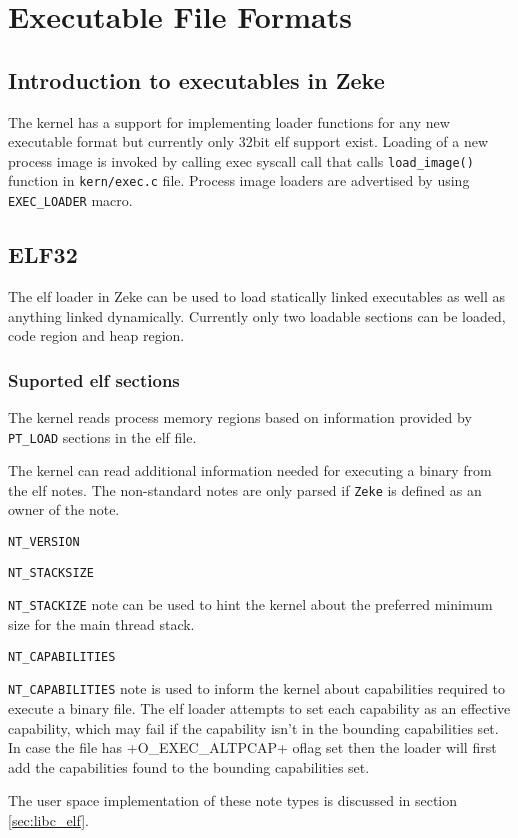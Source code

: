 \chapter{Executable File Formats}
\label{chap:exec}

\section{Introduction to executables in Zeke}

The kernel has a support for implementing loader functions for any new
executable format but currently only 32bit \acf{elf} support exist.
Loading of a new process image is invoked by calling exec syscall call that
calls \verb+load_image()+ function in \verb+kern/exec.c+ file.
Process image loaders are advertised by using \verb+EXEC_LOADER+ macro.

\section{ELF32}

The \acs{elf} loader in Zeke can be used to load statically linked executables
as well as anything linked dynamically. Currently only two loadable sections can
be loaded, code region and heap region.

\subsection{Suported \acs{elf} sections}

The kernel reads process memory regions based on information provided by
\verb+PT_LOAD+ sections in the \acs{elf} file.

The kernel can read additional information needed for executing a binary
from the elf notes. The non-standard notes are only parsed if \verb+Zeke+
is defined as an owner of the note.

\verb+NT_VERSION+

\verb+NT_STACKSIZE+

\verb+NT_STACKIZE+ note can be used to hint the kernel about the preferred
minimum size for the main thread stack.

\verb+NT_CAPABILITIES+

\verb+NT_CAPABILITIES+ note is used to inform the kernel about capabilities
required to execute a binary file. The elf loader attempts to set each
capability as an effective capability, which may fail if the capability
isn't in the bounding capabilities set. In case the file has
\ver+O_EXEC_ALTPCAP+ oflag set then the loader will first add the capabilities
found to the bounding capabilities set.

The user space implementation of these note types is discussed in section
\ref{sec:libc_elf}.
